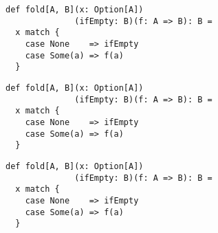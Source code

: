 \documentclass[include/preamble.tex]{subfiles}
\begin{document}
\begin{frame}[fragile]
  \begin{center}
    \begin{lstlisting}[style=scala]
def fold[A, B](x: Option[A])
              (ifEmpty: B)(f: A => B): B =
  x match {
    case None    => ifEmpty
    case Some(a) => f(a)
  }
    \end{lstlisting}
    \pause
  \end{center}
\end{frame}

\begin{frame}[fragile]
  \begin{center}
    \begin{lstlisting}[style=scala]
def fold[A, B](x: Option[A])
              (ifEmpty: B)(f: A => B): B =
  x match {
    case None    => ifEmpty
    case Some(a) => f(a)
  }
    \end{lstlisting}
  \end{center}
\end{frame}

\begin{frame}[fragile]
  \begin{center}
    \begin{lstlisting}[style=scala]
def fold[A, B](x: Option[A])
              (ifEmpty: B)(f: A => B): B =
  x match {
    case None    => ifEmpty
    case Some(a) => f(a)
  }
    \end{lstlisting}
  \end{center}
\end{frame}
\end{document}

